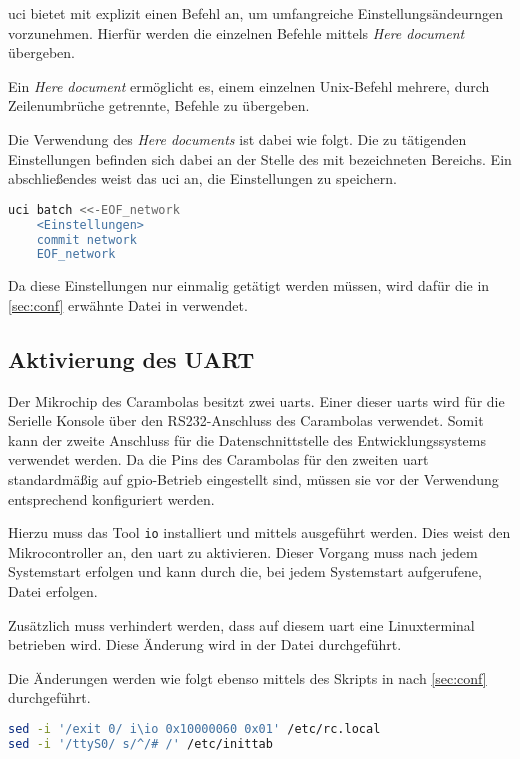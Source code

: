 \gls{uci} bietet mit  explizit einen Befehl an, um
umfangreiche Einstellungsändeurngen vorzunehmen. Hierfür werden die einzelnen
Befehle mittels \emph{Here document} übergeben.

\begin{definition}
Ein \emph{Here document} ermöglicht es, einem einzelnen Unix-Befehl mehrere,
durch Zeilenumbrüche getrennte, Befehle zu übergeben.
\end{definition}
Die Verwendung des \emph{Here documents} ist dabei wie folgt. Die zu tätigenden
Einstellungen befinden sich dabei an der Stelle des mit
 bezeichneten Bereichs. Ein abschließendes
 weist das \gls{uci} an, die Einstellungen zu
speichern.
 \begin{lstlisting}[language=sh]
uci batch <<-EOF_network
	<Einstellungen>
	commit network
	EOF_network
\end{lstlisting}
Da diese Einstellungen nur einmalig getätigt werden müssen, wird dafür die in
\autoref{sec:conf} erwähnte Datei in  verwendet.

\subsection{Aktivierung des UART}\label{subs:aktuart}
Der Mikrochip\cite{RA01} des Carambolas besitzt zwei \glspl{uart}. Einer dieser
\glspl{uart} wird für die Serielle Konsole über den RS232-Anschluss des
Carambolas verwendet. Somit kann der zweite Anschluss für die
Datenschnittstelle des Entwicklungssystems verwendet werden.
Da die Pins des Carambolas für den zweiten \gls{uart} standardmäßig auf
\gls{gpio}-Betrieb eingestellt sind, müssen sie vor der Verwendung entsprechend
konfiguriert werden.

Hierzu muss das Tool \texttt{io} installiert und mittels 
 ausgeführt werden. Dies weist den
Mikrocontroller an, den \gls{uart} zu aktivieren. Dieser Vorgang muss nach jedem
Systemstart erfolgen und kann durch die, bei jedem Systemstart aufgerufene,
Datei  erfolgen.

Zusätzlich muss verhindert werden, dass auf diesem \gls{uart} eine Linuxterminal
betrieben wird. Diese Änderung wird in der Datei 
durchgeführt.

Die Änderungen werden wie folgt ebenso mittels des Skripts in
 nach \autoref{sec:conf} durchgeführt.
\begin{lstlisting}[language=sh]
sed -i '/exit 0/ i\io 0x10000060 0x01' /etc/rc.local
sed -i '/ttyS0/ s/^/# /' /etc/inittab
\end{lstlisting}


